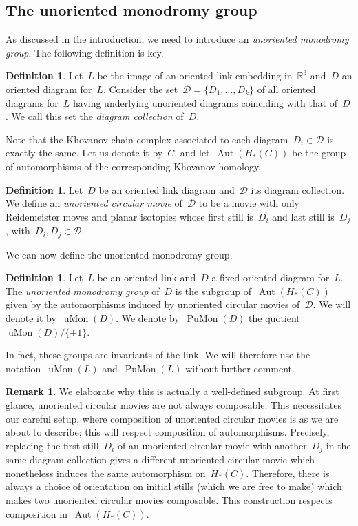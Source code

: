 \documentclass{amsart}
\theoremstyle{definition}
\theoremstyle{definition}
\theoremstyle{definition}
\theoremstyle{definition}
\newtheorem{remark}[theorem]{Remark}
\newtheorem{definition}[theorem]{Definition}
\newcommand{\R}{\mathbb{R}}
\newcommand{\Dcal}{\mathcal{D}}
\DeclareMathOperator{\PuMon}{PuMon}
\DeclareMathOperator{\uMon}{uMon}
\DeclareMathOperator{\Aut}{Aut}
\begin{document}
\subsection{The unoriented monodromy group}\label{subsec:unoriented monodromy group}

As discussed in the introduction, we need to introduce an \emph{unoriented monodromy group}. The following definition is key.

\begin{definition}\label{def:diagram_collection}
    Let~$L$ be the image of an oriented link embedding in~$\R^3$ and~$D$ an oriented diagram for~$L$. Consider the set~$\Dcal=\{D_1, \dots, D_k\}$ of all oriented diagrams for~$L$ having underlying unoriented diagrams coinciding with that of~$D$. We call this set the \emph{diagram collection} of~$D$. 
\end{definition}

Note that the Khovanov chain complex associated to each diagram~$D_i\in\Dcal$ is exactly the same. Let us denote it by~$C$, and let~$\Aut(H_*(C))$ be the group of automorphisms of the corresponding Khovanov homology.

\begin{definition}\label{def: unoriented_circ_movie}
    Let~$D$ be an oriented link diagram and~$\Dcal$ its diagram collection. We define an \textit{unoriented circular movie} of~$\Dcal$ to be a movie with only Reidemeister moves and planar isotopies whose first still is~$D_i$ and last still is~$D_j$, with~$D_i, D_j \in \Dcal$. 
\end{definition}

We can now define the unoriented monodromy group.

\begin{definition}\label{def: unoriented_monodromy}
Let~$L$ be an oriented link and~$D$ a fixed oriented diagram for~$L$. The \emph{unoriented monodromy group} of~$D$ is the subgroup of~$\Aut(H_*(C))$ given by the automorphisms induced by unoriented circular movies of~$\Dcal$. We will denote it by~$\uMon(D)$. We denote by~$\PuMon(D)$ the quotient~$\uMon(D) / \{\pm1\}$.
\end{definition}

In fact, these groups are invariants of the link. We will therefore use the notation~$\uMon(L)$ and~$\PuMon(L)$ without further comment.

\begin{remark}\label{rem:operation}
    We elaborate why this is actually a well-defined subgroup. At first glance, unoriented circular movies are not always composable. This necessitates our careful setup, where composition of unoriented circular movies is as we are about to describe; this will respect composition of automorphisms. Precisely, replacing the first still~$D_i$ of an unoriented circular movie with another~$D_j$ in the same diagram collection gives a different unoriented circular movie which nonetheless induces the same automorphism on~$H_\ast(C)$. Therefore, there is always a choice of orientation on initial stills (which we are free to make) which makes two unoriented circular movies composable. This construction respects composition in~$\Aut(H_\ast(C))$.
\end{remark}
\end{document}
